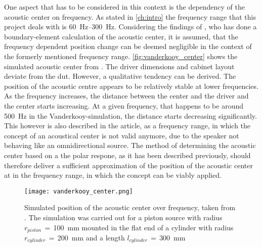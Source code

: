 One aspect that has to be considered in this context is the dependency of the acoustic center on frequency. As stated in \autoref{ch:intro} the frequency range that this project deals with is \SIrange{60}{300}{\hertz}. Considering the findings of \citep{vanderkooy10}, who has done a boundary-element calculation of the acoustic center, it is assumed, that the frequency dependent position change can be deemed  negligible in the context of the formerly mentioned frequency range. 
\autoref{fig:vanderkooy_center} shows the simulated acoustic center from \citep{vanderkooy10}. The driver dimensions and cabinet layout deviate from the \gls{dut}. However, a qualitative tendency can be derived. The position of the acoustic centre appears to be relatively stable at lower frequencies. As the frequency increases, the distance between the center and the driver and the center starts increasing. At a given frequency, that happens to be around \SI{500}{\hertz} in the Vanderkooy-simulation, the distance starts decreasing significantly. This however is also described in the article, as a frequency range, in which the concept of an acoustical center is not valid anymore, due to the speaker not behaving like an omnidirectional source. The method of determining the acoustic center based on a the polar respone, as it has been described previously, should therefore deliver a sufficient approximation of the position of the acoustic center at in the frequency range, in which the concept can be viably applied.
\begin{figure}[htbp]
	\centering
	\texttt{[image: vanderkooy\_center.png]}
	\caption{Simulated position of the acoustic center over frequency, taken from \citep{vanderkooy10}. The simulation was carried out for a piston source with radius \(r_{piston}\,=\,\)\SI{100}{\milli\meter} mounted in the flat end of a cylinder with radius $r_{cylinder}\,=\,$\SI{200}{\milli\meter} and a length $l_{cylinder}\,=\,$\SI{300}{\milli\meter}}

		\label{fig:vanderkooy_center}
\end{figure}


